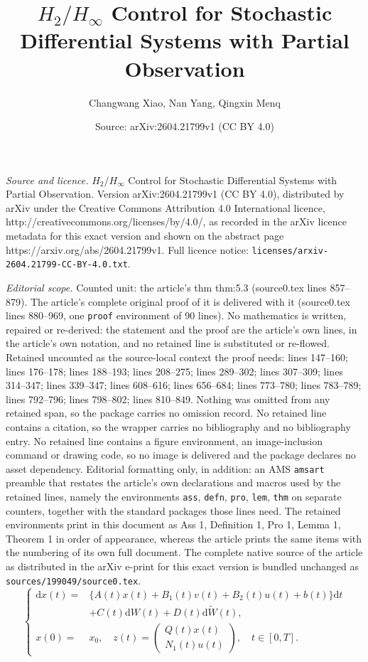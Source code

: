 \documentclass[10pt,a4paper]{amsart}
\title{$H_2/H_{\infty}$ Control for Stochastic Differential Systems with Partial Observation}
\author{Changwang Xiao, Nan Yang, Qingxin Menq}
\date{Source: arXiv:2604.21799v1 (CC BY 4.0)}
\begin{document}
\maketitle

\noindent\emph{Source and licence.} $H_2/H_{\infty}$ Control for Stochastic Differential Systems with Partial Observation. Version arXiv:2604.21799v1 (CC BY 4.0), distributed by arXiv under the Creative Commons Attribution 4.0 International licence, http://creativecommons.org/licenses/by/4.0/, as recorded in the arXiv licence metadata for this exact version and shown on the abstract page https://arxiv.org/abs/2604.21799v1. Full licence notice: \texttt{licenses/arxiv-2604.21799-CC-BY-4.0.txt}.\par\smallskip

\noindent\textit{Editorial scope.} Counted unit: the article's thm thm:5.3 (source0.tex lines 857--879). The article's complete original proof of it is delivered with it (source0.tex lines 880--969, one \texttt{proof} environment of 90 lines). No mathematics is written, repaired or re-derived: the statement and the proof are the article's own lines, in the article's own notation, and no retained line is substituted or re-flowed.  Retained uncounted as the source-local context the proof needs: lines 147--160; lines 176--178; lines 188--193; lines 208--275; lines 289--302; lines 307--309; lines 314--347; lines 339--347; lines 608--616; lines 656--684; lines 773--780; lines 783--789; lines 792--796; lines 798--802; lines 810--849.  Nothing was omitted from any retained span, so the package carries no omission record.  No retained line contains a citation, so the wrapper carries no bibliography and no bibliography entry.  No retained line contains a figure environment, an image-inclusion command or drawing code, so no image is delivered and the package declares no asset dependency.  Editorial formatting only, in addition: an AMS \texttt{amsart} preamble that restates the article's own declarations and macros used by the retained lines, namely the environments \texttt{ass}, \texttt{defn}, \texttt{pro}, \texttt{lem}, \texttt{thm} on separate counters, together with the standard packages those lines need.  The retained environments print in this document as Ass 1, Definition 1, Pro 1, Lemma 1, Theorem 1 in order of appearance, whereas the article prints the same items with the numbering of its own full document.  The complete native source of the article as distributed in the arXiv e-print for this exact version is bundled unchanged as \texttt{sources/199049/source0.tex}.
\begin{equation}\label{eq:2.1}
	\left\{
	\begin{aligned}
		\mathrm{d}x(t) =& \Big\{ A(t)x(t) + B_1(t)v(t) + B_2(t)u(t) + b(t) \Big\} \mathrm{d}t \\
		& + C(t)\mathrm{d}W(t) + D(t)\mathrm{d}\widetilde{W}(t),\\
		x(0)=&x_0,\quad 
		z(t)=
		\begin{pmatrix}
			Q(t)x(t)\\
			N_1(t)u(t)
		\end{pmatrix},\quad t \in [0,T].
	\end{aligned}
	\right.
\end{equation}
\end{document}
